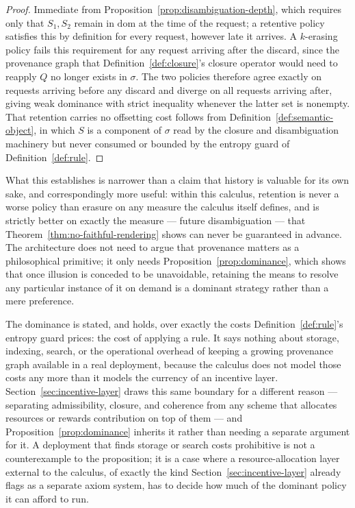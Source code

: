 \documentclass[11pt]{article}
\theoremstyle{definition}
\begin{document}
\begin{proof}
Immediate from Proposition~\ref{prop:disambiguation-depth}, which requires only that $S_1, S_2$ remain in $\mathrm{dom}$ at the time of the request; a retentive policy satisfies this by definition for every request, however late it arrives. A $k$-erasing policy fails this requirement for any request arriving after the discard, since the provenance graph that Definition~\ref{def:closure}'s closure operator would need to reapply $Q$ no longer exists in $\sigma$. The two policies therefore agree exactly on requests arriving before any discard and diverge on all requests arriving after, giving weak dominance with strict inequality whenever the latter set is nonempty. That retention carries no offsetting cost follows from Definition~\ref{def:semantic-object}, in which $S$ is a component of $\sigma$ read by the closure and disambiguation machinery but never consumed or bounded by the entropy guard of Definition~\ref{def:rule}.
\end{proof}

What this establishes is narrower than a claim that history is valuable for its own sake, and correspondingly more useful: within this calculus, retention is never a worse policy than erasure on any measure the calculus itself defines, and is strictly better on exactly the measure --- future disambiguation --- that Theorem~\ref{thm:no-faithful-rendering} shows can never be guaranteed in advance. The architecture does not need to argue that provenance matters as a philosophical primitive; it only needs Proposition~\ref{prop:dominance}, which shows that once illusion is conceded to be unavoidable, retaining the means to resolve any particular instance of it on demand is a dominant strategy rather than a mere preference.

The dominance is stated, and holds, over exactly the costs Definition~\ref{def:rule}'s entropy guard prices: the cost of applying a rule. It says nothing about storage, indexing, search, or the operational overhead of keeping a growing provenance graph available in a real deployment, because the calculus does not model those costs any more than it models the currency of an incentive layer. Section~\ref{sec:incentive-layer} draws this same boundary for a different reason --- separating admissibility, closure, and coherence from any scheme that allocates resources or rewards contribution on top of them --- and Proposition~\ref{prop:dominance} inherits it rather than needing a separate argument for it. A deployment that finds storage or search costs prohibitive is not a counterexample to the proposition; it is a case where a resource-allocation layer external to the calculus, of exactly the kind Section~\ref{sec:incentive-layer} already flags as a separate axiom system, has to decide how much of the dominant policy it can afford to run.
\end{document}
